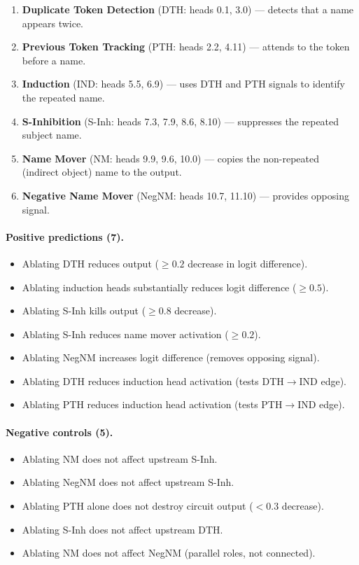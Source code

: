 \documentclass[10pt]{article}
\begin{document}
\begin{enumerate}[nosep]
    \item \textbf{Duplicate Token Detection} (DTH: heads 0.1, 3.0) --- detects that a name appears twice.
    \item \textbf{Previous Token Tracking} (PTH: heads 2.2, 4.11) --- attends to the token before a name.
    \item \textbf{Induction} (IND: heads 5.5, 6.9) --- uses DTH and PTH signals to identify the repeated name.
    \item \textbf{S-Inhibition} (S-Inh: heads 7.3, 7.9, 8.6, 8.10) --- suppresses the repeated subject name.
    \item \textbf{Name Mover} (NM: heads 9.9, 9.6, 10.0) --- copies the non-repeated (indirect object) name to the output.
    \item \textbf{Negative Name Mover} (NegNM: heads 10.7, 11.10) --- provides opposing signal.
\end{enumerate}

\paragraph{Positive predictions (7).}
\begin{itemize}[nosep]
    \item Ablating DTH reduces output ($\geq 0.2$ decrease in logit difference).
    \item Ablating induction heads substantially reduces logit difference ($\geq 0.5$).
    \item Ablating S-Inh kills output ($\geq 0.8$ decrease).
    \item Ablating S-Inh reduces name mover activation ($\geq 0.2$).
    \item Ablating NegNM increases logit difference (removes opposing signal).
    \item Ablating DTH reduces induction head activation (tests DTH$\rightarrow$IND edge).
    \item Ablating PTH reduces induction head activation (tests PTH$\rightarrow$IND edge).
\end{itemize}

\paragraph{Negative controls (5).}
\begin{itemize}[nosep]
    \item Ablating NM does not affect upstream S-Inh.
    \item Ablating NegNM does not affect upstream S-Inh.
    \item Ablating PTH alone does not destroy circuit output ($< 0.3$ decrease).
    \item Ablating S-Inh does not affect upstream DTH.
    \item Ablating NM does not affect NegNM (parallel roles, not connected).
\end{itemize}
\end{document}
